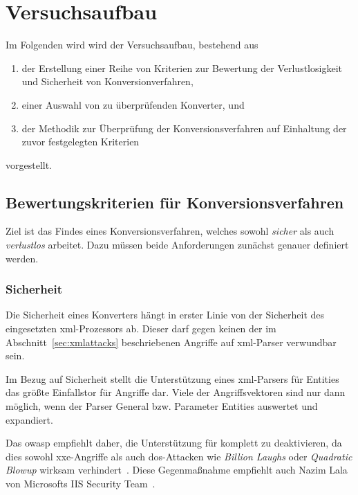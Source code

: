\chapter{Versuchsaufbau}
\label{chap:impl}

\begin{samepage}
Im Folgenden wird wird der Versuchsaufbau, bestehend aus
\begin{enumerate}
    \item{} der Erstellung einer Reihe von Kriterien zur Bewertung der Verlustlosigkeit und Sicherheit von Konversionverfahren,
    \item{} einer Auswahl von zu überprüfenden Konverter, und
    \item{} der Methodik zur Überprüfung der Konversionsverfahren auf Einhaltung der zuvor festgelegten Kriterien
\end{enumerate}
vorgestellt.
\end{samepage}

\section{Bewertungskriterien für Konversionsverfahren}
\label{sec:criteria}

Ziel ist das Findes eines Konversionsverfahren, welches sowohl \emph{sicher} als auch \emph{verlustlos} arbeitet. Dazu müssen beide Anforderungen zunächst genauer definiert werden.

\subsection{Sicherheit}
\label{sec:criteria-security}

Die Sicherheit eines Konverters hängt in erster Linie von der Sicherheit des eingesetzten \acrshort{xml}-Prozessors ab. Dieser darf gegen keinen der im Abschnitt~\ref{sec:xmlattacks} beschriebenen Angriffe auf \acrshort{xml}-Parser verwundbar sein.

Im Bezug auf Sicherheit stellt die Unterstützung eines \acrshort{xml}-Parsers für Entities das größte Einfallstor für Angriffe dar. Viele der Angriffsvektoren sind nur dann möglich, wenn der Parser General bzw. Parameter Entities auswertet und expandiert.

Das \acrfull{owasp} empfiehlt daher, die Unterstützung für  komplett zu deaktivieren, da dies sowohl \acrshort{xxe}-Angriffe als auch \acrshort{dos}-Attacken wie \emph{Billion Laughs} oder \emph{Quadratic Blowup} wirksam verhindert~\cite[Abschn.~1.1]{owasp2017xxeprevention}. Diese Gegenmaßnahme empfiehlt auch Nazim Lala von Microsofts IIS Security Team~\cite{lala2013handlinguntrustedxml}.

